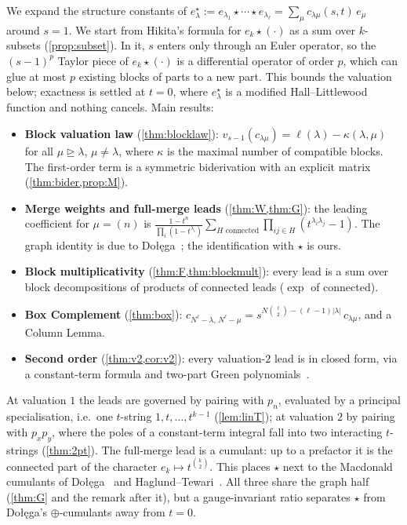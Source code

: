 \documentclass[submission]{FPSAC2027}
\theoremstyle{definition}
\theoremstyle{remark}
\newcommand{\val}{v}
\begin{document}
We expand the structure constants of $e^\star_\lambda:=e_{\lambda_1}\star\cdots\star e_{\lambda_\ell}=\sum_\mu c_{\lambda\mu}(s,t)\,e_\mu$ around $s=1$. We start from Hikita's formula for $e_k\star(\cdot)$ as a sum over $k$-subsets (\cref{prop:subset}). In it, $s$ enters only through an Euler operator, so the $(s-1)^p$ Taylor piece of $e_k\star(\cdot)$ is a differential operator of order $p$, which can glue at most $p$ existing blocks of parts to a new part. This bounds the valuation below; exactness is settled at $t=0$, where $e^\star_\lambda$ is a modified Hall--Littlewood function and nothing cancels. Main results:
\begin{itemize}
  \item \textbf{Block valuation law} (\cref{thm:blocklaw}): $\val_{s-1}(c_{\lambda\mu})=\ell(\lambda)-\kappa(\lambda,\mu)$ for all $\mu\trianglerighteq\lambda$, $\mu\neq\lambda$, where $\kappa$ is the maximal number of compatible blocks. The first-order term is a symmetric biderivation with an explicit matrix (\cref{thm:bider,prop:M}).
  \item \textbf{Merge weights and full-merge leads} (\cref{thm:W,thm:G}): the leading coefficient for $\mu=(n)$ is $\frac{1-t^n}{\prod_i(1-t^{\lambda_i})}\sum_{H\text{ connected}}\prod_{ij\in H}(t^{\lambda_i\lambda_j}-1)$. The graph identity is due to Do{\l}{\k{e}}ga~\cite{Dolega19}; the identification with $\star$ is ours.
  \item \textbf{Block multiplicativity} (\cref{thm:F,thm:blockmult}): every lead is a sum over block decompositions of products of connected leads ($\exp$ of connected).
  \item \textbf{Box Complement} (\cref{thm:box}): $c_{N^\ell-\lambda,\,N^\ell-\mu}=s^{N\binom{\ell}{2}-(\ell-1)|\lambda|}\,c_{\lambda\mu}$, and a Column Lemma.
  \item \textbf{Second order} (\cref{thm:v2,cor:v2}): every valuation-$2$ lead is in closed form, via a constant-term formula and two-part Green polynomials~\cite{Green55,DLT94,Macdonald95}.
\end{itemize}
At valuation $1$ the leads are governed by pairing with $p_n$, evaluated by a principal specialisation, i.e.\ one $t$-string $1,t,\dots,t^{k-1}$ (\cref{lem:linT}); at valuation $2$ by pairing with $p_xp_y$, where the poles of a constant-term integral fall into two interacting $t$-strings (\cref{thm:2pt}). The full-merge lead is a cumulant: up to a prefactor it is the connected part of the character $e_k\mapsto t^{\binom k2}$. This places $\star$ next to the Macdonald cumulants of Do{\l}{\k{e}}ga~\cite{Dolega19} and Haglund--Tewari~\cite{HaglundTewari26}. All three share the graph half (\cref{thm:G} and the remark after it), but a gauge-invariant ratio separates $\star$ from Do{\l}{\k{e}}ga's $\oplus$-cumulants away from $t=0$.
\end{document}
